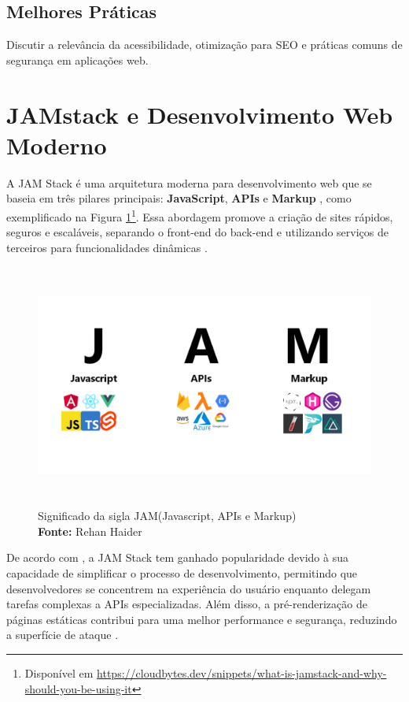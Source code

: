 \subsection{Melhores Práticas}
Discutir a relevância da acessibilidade, otimização para SEO e práticas comuns de segurança em aplicações web.


\section{JAMstack e Desenvolvimento Web Moderno}
\label{sec:jamstack}
A JAM Stack é uma arquitetura moderna para desenvolvimento web que se baseia em três pilares principais: \textbf{JavaScript}, \textbf{APIs} e \textbf{Markup} \citep{jamstackorg}, como exemplificado na Figura \ref{fig:jamStack sigla}\footnote{Disponível em \href{https://cloudbytes.dev/snippets/what-is-jamstack-and-why-should-you-be-using-it}{https://cloudbytes.dev/snippets/what-is-jamstack-and-why-should-you-be-using-it}}. Essa abordagem promove a criação de sites rápidos, seguros e escaláveis, separando o front-end do back-end e utilizando serviços de terceiros para funcionalidades dinâmicas \citep{netlifyjamstack}.

\begin{figure}[H]
    \centering
    \includegraphics[height=8cm, keepaspectratio]{img/arquitetura/sigla JAM stack.png}
    \caption{ Significado da sigla JAM(Javascript, APIs e Markup)
 \\
        \textbf{Fonte:} Rehan Haider}
    \label{fig:jamStack sigla}
\end{figure}
De acordo com \cite{smashingmagazine}, a JAM Stack tem ganhado popularidade devido à sua capacidade de simplificar o processo de desenvolvimento, permitindo que desenvolvedores se concentrem na experiência do usuário enquanto delegam tarefas complexas a APIs especializadas. Além disso, a pré-renderização de páginas estáticas contribui para uma melhor performance e segurança, reduzindo a superfície de ataque \citep{jamstackbook}.

